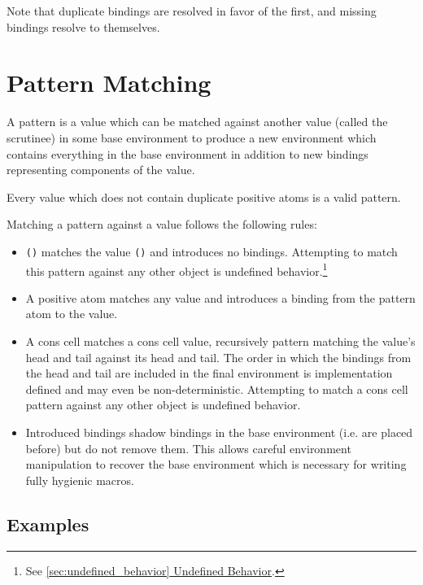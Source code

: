 \documentclass[twocolumn]{report}
\newcommand{\intralink}[2]{\hyperref[#1]{\ref*{#1} #2}}
\begin{document}
Note that duplicate bindings are resolved in favor of the first, and missing bindings resolve to themselves.

\section{Pattern Matching}
\label{sec:pattern_matching}

A pattern is a value which can be matched against another value (called the scrutinee) in some base environment to produce a new environment which contains everything in the base environment in addition to new bindings representing components of the value.

Every value which does not contain duplicate positive atoms is a valid pattern.

Matching a pattern against a value follows the following rules:
\begin{itemize}
\item \texttt{()} matches the value \texttt{()} and introduces no bindings.
Attempting to match this pattern against any other object is undefined behavior.\footnote{See \intralink{sec:undefined_behavior}{Undefined Behavior}.}
\item A positive atom matches any value and introduces a binding from the pattern atom to the value.
\item A cons cell matches a cons cell value, recursively pattern matching the value's head and tail against its head and tail.
The order in which the bindings from the head and tail are included in the final environment is implementation defined and may even be non-deterministic.
Attempting to match a cons cell pattern against any other object is undefined behavior.
\item Introduced bindings shadow bindings in the base environment (i.e. are placed before) but do not remove them.
This allows careful environment manipulation to recover the base environment which is necessary for writing fully hygienic macros.
\end{itemize}

\subsection{Examples}
\label{subsec:pattern_matching_examples}
\end{document}
